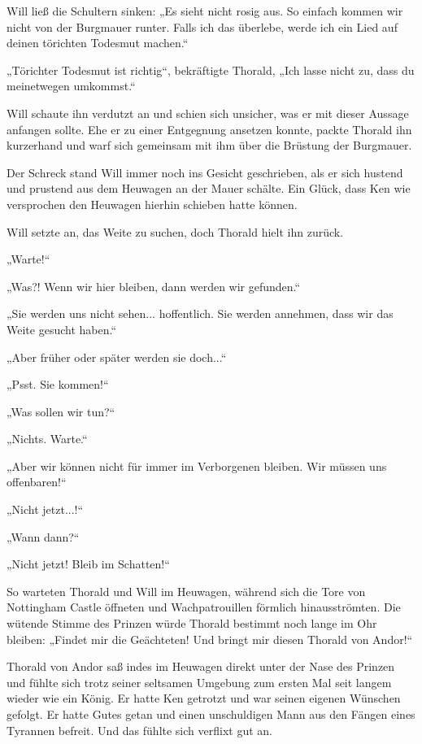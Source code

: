 Will ließ die Schultern sinken: „Es sieht nicht rosig aus. So einfach kommen wir nicht von der Burgmauer runter. Falls ich das überlebe, werde ich ein Lied auf deinen törichten Todesmut machen.“

„Törichter Todesmut ist richtig“, bekräftigte Thorald, „Ich lasse nicht zu, dass du meinetwegen umkommst.“

Will schaute ihn verdutzt an und schien sich unsicher, was er mit dieser Aussage anfangen sollte. Ehe er zu einer Entgegnung ansetzen konnte, packte Thorald ihn kurzerhand und warf sich gemeinsam mit ihm über die Brüstung der Burgmauer.

Der Schreck stand Will immer noch ins Gesicht geschrieben, als er sich hustend und prustend aus dem Heuwagen an der Mauer schälte. Ein Glück, dass Ken wie versprochen den Heuwagen hierhin schieben hatte können.

Will setzte an, das Weite zu suchen, doch Thorald hielt ihn zurück.

„Warte!“

„Was?! Wenn wir hier bleiben, dann werden wir gefunden.“

„Sie werden uns nicht sehen... hoffentlich. Sie werden annehmen, dass wir das Weite gesucht haben.“

„Aber früher oder später werden sie doch...“

„Psst. Sie kommen!“

„Was sollen wir tun?“

„Nichts. Warte.“

„Aber wir können nicht für immer im Verborgenen bleiben. Wir müssen uns offenbaren!“

„Nicht jetzt...!“

„Wann dann?“

„Nicht jetzt! Bleib im Schatten!“

So warteten Thorald und Will im Heuwagen, während sich die Tore von Nottingham Castle öffneten und Wachpatrouillen förmlich hinausströmten. Die wütende Stimme des Prinzen würde Thorald bestimmt noch lange im Ohr bleiben: „Findet mir die Geächteten! Und bringt mir diesen Thorald von Andor!“

Thorald von Andor saß indes im Heuwagen direkt unter der Nase des Prinzen und fühlte sich trotz seiner seltsamen Umgebung zum ersten Mal seit langem wieder wie ein König. Er hatte Ken getrotzt und war seinen eigenen Wünschen gefolgt. Er hatte Gutes getan und einen unschuldigen Mann aus den Fängen eines Tyrannen befreit. Und das fühlte sich verflixt gut an.



